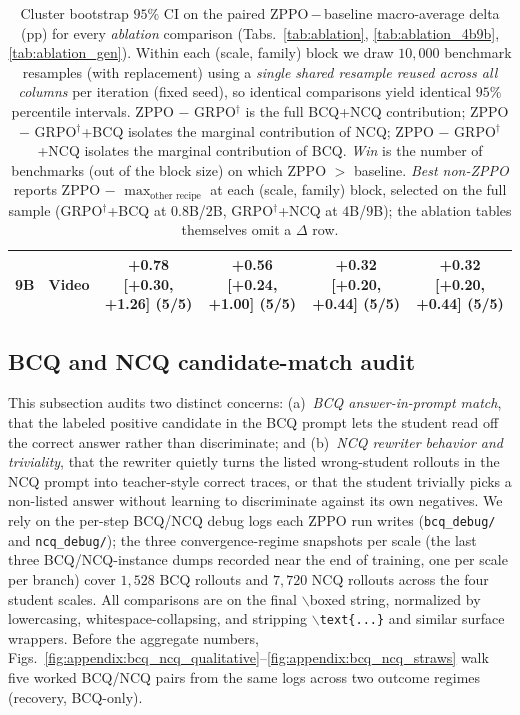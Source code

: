 \documentclass{llmxive}
\begin{document}
\begin{table}[!htbp]
{\begin{tabular}{llcccc}
        9B & Video & +0.78 [+0.30, +1.26] (5/5) & +0.56 [+0.24, +1.00] (5/5) & +0.32 [+0.20, +0.44] (5/5) & +0.32 [+0.20, +0.44] (5/5) \\
        \bottomrule
    \end{tabular}%
    }
    \caption{Cluster bootstrap $95\%$ CI on the paired ZPPO\,$-$\,baseline macro-average delta (pp) for every \emph{ablation} comparison (Tabs.~\ref{tab:ablation}, \ref{tab:ablation_4b9b}, \ref{tab:ablation_gen}). Within each (scale, family) block we draw $10{,}000$ benchmark resamples (with replacement) using a \emph{single shared resample reused across all columns} per iteration (fixed seed), so identical comparisons yield identical $95\%$ percentile intervals. ZPPO $-$ GRPO$^{\dagger}$ is the full BCQ+NCQ contribution; ZPPO $-$ GRPO$^{\dagger}$+BCQ isolates the marginal contribution of NCQ; ZPPO $-$ GRPO$^{\dagger}$+NCQ isolates the marginal contribution of BCQ. \emph{Win} is the number of benchmarks (out of the block size) on which ZPPO $>$ baseline. \emph{Best non-ZPPO} reports ZPPO $-$ $\max\nolimits_{\text{other recipe}}$ at each (scale, family) block, selected on the full sample (GRPO$^{\dagger}$+BCQ at $0.8$B/$2$B, GRPO$^{\dagger}$+NCQ at $4$B/$9$B); the ablation tables themselves omit a $\Delta$ row.}
    \label{tab:appendix:ci_ablation}
\end{table}


\subsection{BCQ and NCQ candidate-match audit}
\label{sec:appendix:bcq_audit}

This subsection audits two distinct concerns: (a)~\emph{BCQ answer-in-prompt match}, that the labeled positive candidate in the BCQ prompt lets the student read off the correct answer rather than discriminate; and (b)~\emph{NCQ rewriter behavior and triviality}, that the rewriter quietly turns the listed wrong-student rollouts in the NCQ prompt into teacher-style correct traces, or that the student trivially picks a non-listed answer without learning to discriminate against its own negatives. We rely on the per-step BCQ/NCQ debug logs each ZPPO run writes (\texttt{bcq\_debug/} and \texttt{ncq\_debug/}); the three convergence-regime snapshots per scale (the last three BCQ/NCQ-instance dumps recorded near the end of training, one per scale per branch) cover $1{,}528$ BCQ rollouts and $7{,}720$ NCQ rollouts across the four student scales. All comparisons are on the final $\backslash$boxed string, normalized by lowercasing, whitespace-collapsing, and stripping $\backslash$\texttt{text\{...\}} and similar surface wrappers. Before the aggregate numbers, Figs.~\ref{fig:appendix:bcq_ncq_qualitative}--\ref{fig:appendix:bcq_ncq_straws} walk five worked BCQ/NCQ pairs from the same logs across two outcome regimes (recovery, BCQ-only).
\end{document}
